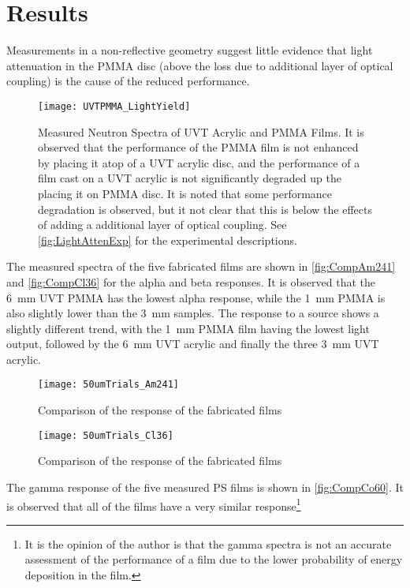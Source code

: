 \documentclass[draftcls,onecolumn]{IEEEtran}
\begin{document}
\section{Results}
Measurements in a non-reflective geometry suggest little evidence that light attenuation in the PMMA disc (above the loss due to additional layer of optical coupling) is the cause of the reduced performance.
\begin{figure}
  \centering
  \texttt{[image: UVTPMMA\_LightYield]}
  \caption[Measured Effect of UVT acrylic and PMMA]{Measured Neutron Spectra of UVT Acrylic and PMMA Films. It is observed that the performance of the PMMA film is not enhanced by placing it atop of a UVT acrylic disc, and the performance of a film cast on a UVT acrylic is not significantly degraded up the placing it on PMMA disc. It is noted that some performance degradation is observed, but it not clear that this is below the effects of adding a additional layer of optical coupling. See \autoref{fig:LightAttenExp} for the experimental descriptions.}
  \label{fig:RadMeasuredExper}
\end{figure}
The measured spectra of the five fabricated films are shown in \autoref{fig:CompAm241} and \autoref{fig:CompCl36} for the alpha and beta responses.
It is observed that the \SI{6}{\mm} UVT PMMA has the lowest alpha response, while the \SI{1}{\mm} PMMA is also slightly lower than the \SI{3}{\mm} samples.
The response to a  source shows a slightly different trend, with the \SI{1}{\mm} PMMA film having the lowest light output, followed by the \SI{6}{\mm} UVT acrylic and finally the three \SI{3}{\mm} UVT acrylic.
\begin{figure}[ht]
  \centering
  \texttt{[image: 50umTrials\_Am241]}
  \caption[Fabricated Film Comparison (Alpha)]{Comparison of the  response of the fabricated films}
  \label{fig:CompAm241}
\end{figure}
\begin{figure}[ht]
  \centering
  \texttt{[image: 50umTrials\_Cl36]}
  \caption[Fabricated Film Comparison (Beta)]{Comparison of the  response of the fabricated films}
  \label{fig:CompCl36}
\end{figure}
The gamma response of the five measured PS films is shown in \autoref{fig:CompCo60}.
It is observed that all of the films have a very similar response\footnote{It is the opinion of the author is that the gamma spectra is not an accurate assessment of the performance of a film due to the lower probability of energy deposition in the film.}
\end{document}
